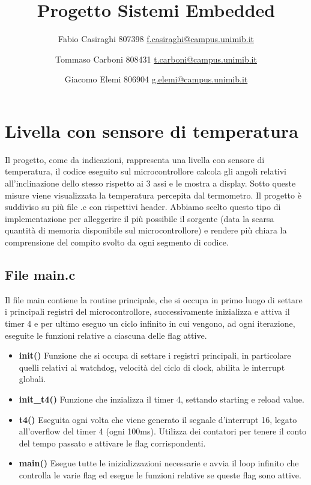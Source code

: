 \documentclass[11pt]{article}
\author{
Fabio Casiraghi 807398 \href{mailto:f.casiraghi@campus.unimib.it}{f.casiraghi@campus.unimib.it}
\and
Tommaso Carboni 808431 \href{mailto:t.carboni@campus.unimib.it} {t.carboni@campus.unimib.it}
\and
Giacomo Elemi 806904 \href{mailto:g.elemi@campus.unimib.it} {g.elemi@campus.unimib.it}
}
\title{Progetto Sistemi Embedded}
\begin{document}
\maketitle
\vspace{2cm}

\section*{Livella con sensore di temperatura}
Il progetto, come da indicazioni, rappresenta una livella con sensore di temperatura, il codice eseguito sul microcontrollore calcola gli angoli relativi all'inclinazione dello stesso rispetto ai 3 assi e le mostra a display. Sotto queste misure viene visualizzata la temperatura percepita dal termometro.
Il progetto è suddiviso su più file .c con rispettivi header. Abbiamo scelto questo tipo di implementazione per alleggerire il più possibile il sorgente (data la scarsa quantità di memoria disponibile sul microcontrollore) e rendere più chiara la comprensione del compito svolto da ogni segmento di codice.

\subsection*{File main.c}
Il file main contiene la routine principale, che si occupa in primo luogo di settare i principali registri del microcontrollore, successivamente inizializza e attiva il timer 4 e per ultimo eseguo un ciclo infinito in cui vengono, ad ogni iterazione, eseguite le funzioni relative a ciascuna delle flag attive.
\begin{itemize}
\item \textbf{init()} Funzione che si occupa di settare i registri principali, in particolare quelli relativi al watchdog, velocità del ciclo di clock, abilita le interrupt globali.
\item \textbf{init\_t4()} Funzione che inzializza il timer 4, settando starting e reload value.
\item \textbf{t4()} Eseguita ogni volta che viene generato il segnale d'interrupt 16, legato all'overflow del timer 4 (ogni 100ms). Utilizza dei contatori per tenere il conto del tempo passato e attivare le flag corrispondenti.
\item \textbf{main()} Esegue tutte le inizializzazioni necessarie e avvia il loop infinito che controlla le varie flag ed esegue le funzioni relative se queste flag sono attive.
\end{itemize}
\end{document}
